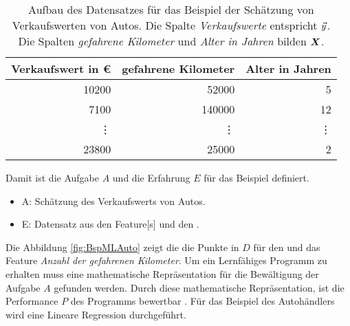 \begin{table}
    \centering
    \begin{tabular}{|r|r|r|}
     \hline
        Verkaufswert in €   & gefahrene Kilometer   & Alter in Jahren\\
     \hline
        10200               & 52000                 & 5             \\
     \hline
        7100                & 140000                & 12            \\
     \hline
        \vdots              & \vdots                & \vdots        \\
     \hline
         23800              & 25000                 & 2             \\
      \hline
    \end{tabular}
    \caption{Aufbau des Datensatzes für das Beispiel der Schätzung von Verkaufswerten von Autos. Die Spalte \textit{Verkaufswerte} entspricht \(\vec{y}\). Die Spalten \textit{gefahrene Kilometer} und \textit{Alter in Jahren} bilden \(\boldsymbol{X}\). }
    \label{tab:BspMLAuto}
\end{table}

Damit ist die Aufgabe \(A\) und die Erfahrung \(E\) für das Beispiel definiert. 

\begin{itemize}
    \item A: Schätzung des Verkaufswerts von Autos.
    \item E: Datensatz aus den \gls{Feature}[s] und den .
\end{itemize}


Die Abbildung \ref{fig:BspMLAuto} zeigt die die Punkte in \(D\) für den  und das \gls{Feature} \textit{Anzahl der gefahrenen Kilometer}. Um ein Lernfähiges Programm zu erhalten muss eine mathematische Repräsentation für die Bewältigung der Aufgabe \(A\) gefunden werden. Durch diese mathematische Repräsentation, ist die Performance \(P\) des Programms bewertbar \cite{Mitchell.1997}. Für das Beispiel des Autohändlers wird eine Lineare Regression durchgeführt. 